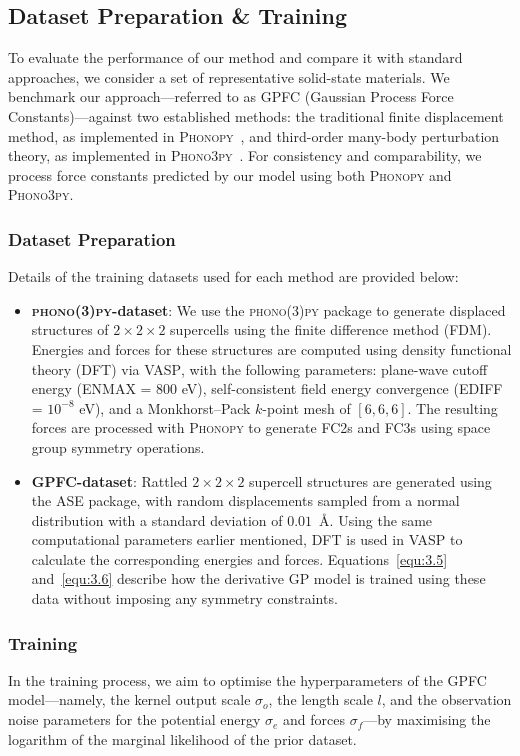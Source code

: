 \subsection{Dataset Preparation \& Training} \label{subsec:3.1.2}

To evaluate the performance of our method and compare it with standard approaches, we consider a set of representative solid-state materials. We benchmark our approach—referred to as GPFC (Gaussian Process Force Constants)—against two established methods: the traditional finite displacement method, as implemented in \textsc{Phonopy}~\cite{phonopy,Phonopy_toolkit}, and third-order many-body perturbation theory, as implemented in \textsc{Phono3py}~\cite{Togo2015-qf,Phonopy_toolkit}. For consistency and comparability, we process force constants predicted by our model using both \textsc{Phonopy} and \textsc{Phono3py}.
\subsubsection{Dataset Preparation}
Details of the training datasets used for each method are provided below:
\begin{itemize}
    \item \textbf{\textsc{phono(3)py}-dataset}: We use the \textsc{phono(3)py} package to generate displaced structures of $2 \times 2 \times 2$ supercells using the finite difference method (FDM). Energies and forces for these structures are computed using density functional theory (DFT) via \textsc{VASP}, with the following parameters: plane-wave cutoff energy (\textsc{ENMAX} = 800 eV), self-consistent field energy convergence (\textsc{EDIFF} = $10^{-8}$ eV), and a Monkhorst–Pack $k$-point mesh of $[6, 6, 6]$. The resulting forces are processed with \textsc{Phonopy} to generate FC2s and FC3s using space group symmetry operations.
    \item \textbf{\textsc{GPFC}-dataset}: Rattled $2 \times 2 \times 2$ supercell structures are generated using the \textsc{ASE} package, with random displacements sampled from a normal distribution with a standard deviation of $0.01$~\AA. Using the same computational parameters earlier mentioned, DFT is used in \textsc{VASP} to calculate the corresponding energies and forces.  Equations~\eqref{equ:3.5} and~\eqref{equ:3.6} describe how the derivative GP model is trained using these data without imposing any symmetry constraints.
\end{itemize}
\subsubsection{Training}
In the training process, we aim to optimise the hyperparameters of the GPFC model—namely, the kernel output scale $\sigma_{o}$, the length scale $l$, and the observation noise parameters for the potential energy $\sigma_{e}$ and forces $\sigma_{f}$—by maximising the logarithm of the marginal likelihood of the prior dataset.

